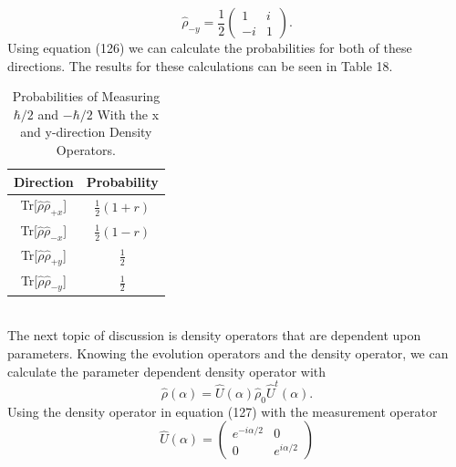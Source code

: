 \documentclass[twocolumn]{article}
\begin{document}
\begin{equation}
\hat{\rho}_{-y}=\frac{1}{2}
\begin{pmatrix}
1 & i \\
-i & 1
\end{pmatrix}.
\end{equation}
Using equation (126) we can calculate the probabilities for both of these directions. The results for these calculations can be seen in Table 18.
\begin{table}[h!]
\begin{center}
\begin{tabular}{ |c|c| }
\hline Direction & Probability \\
\hline Tr[$\hat{\rho}\hat{\rho}_{+x}$] & $\frac{1}{2}(1+r)$ \\
\hline Tr[$\hat{\rho}\hat{\rho}_{-x}$] & $\frac{1}{2}(1-r)$ \\
\hline Tr[$\hat{\rho}\hat{\rho}_{+y}$] & $\frac{1}{2}$ \\
\hline Tr[$\hat{\rho}\hat{\rho}_{-y}$] & $\frac{1}{2}$ \\
\hline
\end{tabular} 
\caption{Probabilities of Measuring $\hbar/2$ and $-\hbar/2$ With the x and y-direction Density Operators.}
\end{center}
\end{table} \\
The next topic of discussion is density operators that are dependent upon parameters. Knowing the evolution operators and the density operator, we can calculate the parameter dependent density operator with
\begin{equation}
\hat{\rho}(\alpha)=\hat{U}(\alpha)\hat{\rho}_0\hat{U}^{t}(\alpha).
\end{equation}
Using the density operator in equation (127) with the measurement operator
\begin{equation}
\hat{U}(\alpha)=
\begin{pmatrix}
e^{-i\alpha/2} & 0 \\
0 & e^{i\alpha/2}
\end{pmatrix}
\end{equation}
\end{document}
